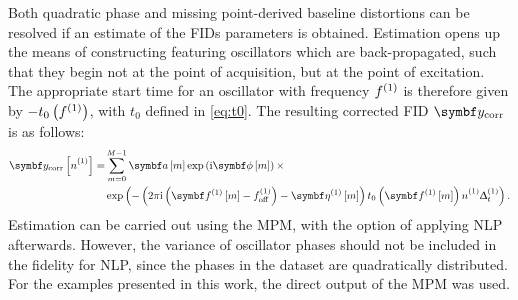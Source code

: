 Both quadratic phase and missing point-derived baseline distortions can be
resolved if an estimate of the \acp{FID} parameters is obtained. Estimation
opens up the means of constructing  featuring oscillators which
are back-propagated, such that they begin not at the point of acquisition, but
at the point of excitation. The appropriate start time for an oscillator with
frequency $f^{(1)}$ is therefore given by $-t_0\left( f^{(1)} \right)$, with  $t_0$
defined in \eqref{eq:t0}. The resulting corrected \ac{FID} $\by_{\text{corr}}$
is as follows:
\begin{equation}
    \begin{split}
        \by_{\text{corr}} \left[ \none \right] =
            &\sum_{m=0}^{M-1} \bdam \exp \left( \iu \bdphim \right) \times \\
            &\exp\left(-
            \left(2 \pi \iu \left(\bdfonem - \foffone \right) - \bdetaonem \right)
            t_0 \left(\bdfonem\right) \none \Dtone
            \right).
    \end{split}
\end{equation}
Estimation can be carried out using the \ac{MPM}, with the option of applying
\ac{NLP} afterwards. However, the variance of oscillator phases should not be
included in the fidelity for \ac{NLP}, since the phases in the dataset are
quadratically distributed. For the examples presented in this work, the direct
output of the \ac{MPM} was used.

